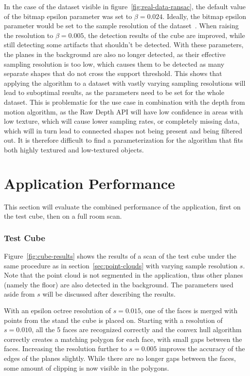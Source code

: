 In the case of the dataset visible in figure~\ref{fig:real-data-ransac},
the default value of the bitmap epsilon parameter was set to $\beta=0.024$.
Ideally, the bitmap epsilon parameter would be set to the sample resolution of the dataset~\parencite{schnabel_efficient_2007}.
When raising the resolution to $\beta=0.005$, the detection results of the cube are improved,
while still detecting some artifacts that shouldn't be detected.
With these parameters, the planes in the background are also no longer detected,
as their effective sampling resolution is too low, which causes them to be detected as many separate shapes that do not cross the support threshold.
This shows that applying the algorithm to a dataset with vastly varying sampling resolutions will
lead to suboptimal results, as the parameters need to be set for the whole dataset.
This is problematic for the use case in combination with the depth from motion algorithm, as the Raw Depth API
will have low confidence in areas with low texture, which will cause lower sampling rates, or completely missing data,
which will in turn lead to connected shapes not being present and being filtered out.
It is therefore difficult to find a parameterization for the algorithm that fits both highly textured and low-textured objects.


\section{Application Performance}\label{sec:application-performance-of-full-room-scan}

This section will evaluate the combined performance of the application, first on the test cube, then on a full room scan.

\subsubsection{Test Cube}
Figure~\ref{fig:cube-results} shows the results of a scan of the test cube under the same procedure as in section~\ref{sec:point-clouds} with varying sample resolution $s$.
Note that the point cloud is not segmented in the application, thus other planes (namely the floor) are also detected in the background.
The parameters used aside from $s$ will be discussed after describing the results.

With an epsilon octree resolution of $s=0.015$, one of the faces is merged with points from the stand the cube is placed on.
Starting with a resolution of $s=0.010$, all the 5 faces are recognized correctly and
the convex hull algorithm correctly creates a matching polygon for each face, with small gaps between the faces.
Increasing the resolution further to $s=0.005$ improves the accuracy of the edges of the planes slightly.
While there are no longer gaps between the faces, some amount of clipping is now visible in the polygons.

